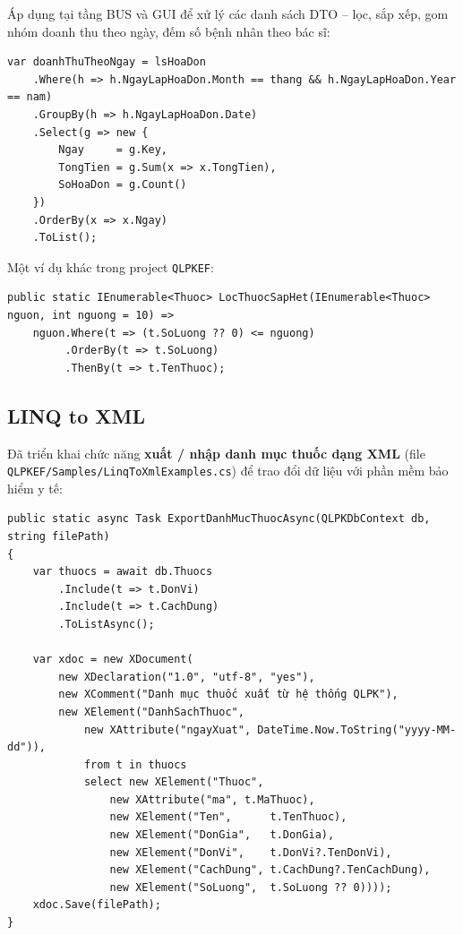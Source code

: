 \documentclass[12pt,a4paper]{report}
\begin{document}
Áp dụng tại tầng BUS và GUI để xử lý các danh sách DTO -- lọc, sắp xếp, gom nhóm doanh thu theo ngày, đếm số bệnh nhân theo bác sĩ:

\begin{lstlisting}[style=csharp,caption={LINQ to Objects -- gom nhóm hóa đơn theo ngày}]
var doanhThuTheoNgay = lsHoaDon
    .Where(h => h.NgayLapHoaDon.Month == thang && h.NgayLapHoaDon.Year == nam)
    .GroupBy(h => h.NgayLapHoaDon.Date)
    .Select(g => new {
        Ngay     = g.Key,
        TongTien = g.Sum(x => x.TongTien),
        SoHoaDon = g.Count()
    })
    .OrderBy(x => x.Ngay)
    .ToList();
\end{lstlisting}

Một ví dụ khác trong project \texttt{QLPKEF}:

\begin{lstlisting}[style=csharp,caption={LINQ to Objects -- lọc thuốc tồn kho thấp}]
public static IEnumerable<Thuoc> LocThuocSapHet(IEnumerable<Thuoc> nguon, int nguong = 10) =>
    nguon.Where(t => (t.SoLuong ?? 0) <= nguong)
         .OrderBy(t => t.SoLuong)
         .ThenBy(t => t.TenThuoc);
\end{lstlisting}

\subsection{LINQ to XML}

Đã triển khai chức năng \textbf{xuất / nhập danh mục thuốc dạng XML} (file \texttt{QLPKEF/Samples/LinqToXmlExamples.cs}) để trao đổi dữ liệu với phần mềm bảo hiểm y tế:

\begin{lstlisting}[style=csharp,caption={LINQ to XML -- xuất danh mục thuốc ra file XML}]
public static async Task ExportDanhMucThuocAsync(QLPKDbContext db, string filePath)
{
    var thuocs = await db.Thuocs
        .Include(t => t.DonVi)
        .Include(t => t.CachDung)
        .ToListAsync();

    var xdoc = new XDocument(
        new XDeclaration("1.0", "utf-8", "yes"),
        new XComment("Danh mục thuốc xuất từ hệ thống QLPK"),
        new XElement("DanhSachThuoc",
            new XAttribute("ngayXuat", DateTime.Now.ToString("yyyy-MM-dd")),
            from t in thuocs
            select new XElement("Thuoc",
                new XAttribute("ma", t.MaThuoc),
                new XElement("Ten",      t.TenThuoc),
                new XElement("DonGia",   t.DonGia),
                new XElement("DonVi",    t.DonVi?.TenDonVi),
                new XElement("CachDung", t.CachDung?.TenCachDung),
                new XElement("SoLuong",  t.SoLuong ?? 0))));
    xdoc.Save(filePath);
}
\end{lstlisting}
\end{document}
